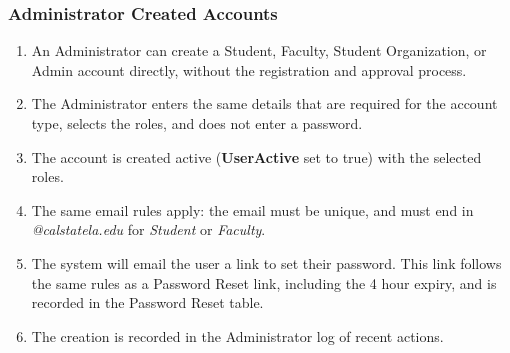     \subsubsection{Administrator Created Accounts}
        \begin{enumerate}[leftmargin=3\parindent]
            \item An Administrator can create a Student, Faculty, Student Organization, or Admin account directly, without the registration and approval process.
            \item The Administrator enters the same details that are required for the account type, selects the roles, and does not enter a password.
            \item The account is created active (\textbf{UserActive} set to true) with the selected roles.
            \item The same email rules apply: the email must be unique, and must end in \emph{@calstatela.edu} for \emph{Student} or \emph{Faculty}.
            \item The system will email the user a link to set their password. This link follows the same rules as a Password Reset link, including the 4 hour expiry, and is recorded in the Password Reset table.
            \item The creation is recorded in the Administrator log of recent actions.
        \end{enumerate}
